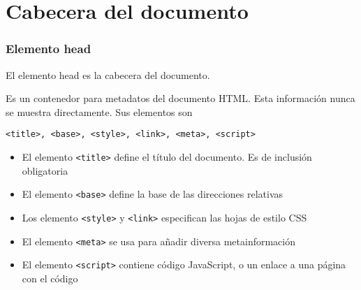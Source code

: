 \documentclass[ucs]{beamer}
\begin{document}
\section{Cabecera del documento}
\begin{frame}[fragile]
\frametitle{Elemento head}

El elemento head es la cabecera del documento.

Es un contenedor para metadatos del documento HTML. Esta información nunca se muestra directamente.
Sus elementos son
  \begin{verbatim}
<title>, <base>, <style>, <link>, <meta>, <script>
  \end{verbatim}



\begin{itemize}
\item
El elemento \verb|<title>| define el título del documento. Es de inclusión obligatoria
\item
El elemento \verb|<base>| define la base de las direcciones relativas
\item
Los elemento 
\verb|<style>| 
y
\verb|<link>| 
especifican las hojas de estilo CSS
\item
El elemento \verb|<meta>| se usa para añadir diversa metainformación
\item
El elemento \verb|<script>| contiene código JavaScript, o un enlace a una página con el código

\end{itemize}
\end{frame}
\end{document}
